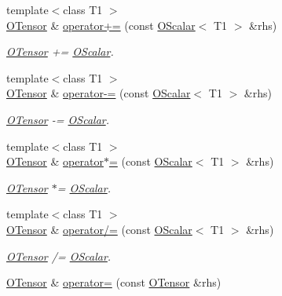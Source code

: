 \begin{DoxyCompactItemize}
{\footnotesize template$<$class T1 $>$ }\\\mbox{\hyperlink{classENSEM_1_1OTensor}{O\+Tensor}} \& \mbox{\hyperlink{classENSEM_1_1OTensor_a93fe0d4638104ad0f6bdaf5de7760276}{operator+=}} (const \mbox{\hyperlink{classENSEM_1_1OScalar}{O\+Scalar}}$<$ T1 $>$ \&rhs)
\begin{DoxyCompactList}\small\item\em \mbox{\hyperlink{classENSEM_1_1OTensor}{O\+Tensor}} += \mbox{\hyperlink{classENSEM_1_1OScalar}{O\+Scalar}}. \end{DoxyCompactList}\item 
{\footnotesize template$<$class T1 $>$ }\\\mbox{\hyperlink{classENSEM_1_1OTensor}{O\+Tensor}} \& \mbox{\hyperlink{classENSEM_1_1OTensor_a61ebd11eac882623ea080293b007972b}{operator-\/=}} (const \mbox{\hyperlink{classENSEM_1_1OScalar}{O\+Scalar}}$<$ T1 $>$ \&rhs)
\begin{DoxyCompactList}\small\item\em \mbox{\hyperlink{classENSEM_1_1OTensor}{O\+Tensor}} -\/= \mbox{\hyperlink{classENSEM_1_1OScalar}{O\+Scalar}}. \end{DoxyCompactList}\item 
{\footnotesize template$<$class T1 $>$ }\\\mbox{\hyperlink{classENSEM_1_1OTensor}{O\+Tensor}} \& \mbox{\hyperlink{classENSEM_1_1OTensor_a0326883980545068700bbdd762df5904}{operator$\ast$=}} (const \mbox{\hyperlink{classENSEM_1_1OScalar}{O\+Scalar}}$<$ T1 $>$ \&rhs)
\begin{DoxyCompactList}\small\item\em \mbox{\hyperlink{classENSEM_1_1OTensor}{O\+Tensor}} $\ast$= \mbox{\hyperlink{classENSEM_1_1OScalar}{O\+Scalar}}. \end{DoxyCompactList}\item 
{\footnotesize template$<$class T1 $>$ }\\\mbox{\hyperlink{classENSEM_1_1OTensor}{O\+Tensor}} \& \mbox{\hyperlink{classENSEM_1_1OTensor_a02520659679c7946a5bb0ce75b3824cb}{operator/=}} (const \mbox{\hyperlink{classENSEM_1_1OScalar}{O\+Scalar}}$<$ T1 $>$ \&rhs)
\begin{DoxyCompactList}\small\item\em \mbox{\hyperlink{classENSEM_1_1OTensor}{O\+Tensor}} /= \mbox{\hyperlink{classENSEM_1_1OScalar}{O\+Scalar}}. \end{DoxyCompactList}\item 
\mbox{\hyperlink{classENSEM_1_1OTensor}{O\+Tensor}} \& \mbox{\hyperlink{classENSEM_1_1OTensor_a08690a1808269fccd113a9d634c7a73f}{operator=}} (const \mbox{\hyperlink{classENSEM_1_1OTensor}{O\+Tensor}} \&rhs)

\end{DoxyCompactItemize}
